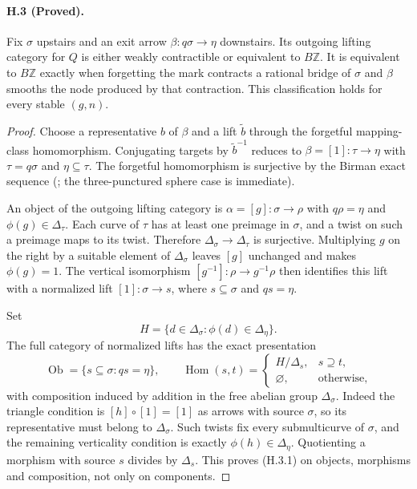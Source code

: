 \paragraph{H.3 (Proved).}
Fix $\sigma$ upstairs and an exit arrow
$\beta:q\sigma\to\eta$ downstairs. Its outgoing lifting
category for $Q$ is either weakly contractible or equivalent to
$B\mathbb Z$. It is equivalent to $B\mathbb Z$ exactly when
forgetting the mark contracts a rational bridge of $\sigma$ and
$\beta$ smooths the node produced by that contraction. This
classification holds for every stable $(g,n)$.
\begin{proof}
Choose a representative $b$ of $\beta$ and a lift $\widetilde b$
through the forgetful mapping-class homomorphism. Conjugating
targets by $\widetilde b^{-1}$ reduces to
$\beta=[1]:\tau\to\eta$ with $\tau=q\sigma$ and
$\eta\subseteq\tau$. The forgetful homomorphism is surjective
by the Birman exact sequence (\citealp[Section 2]{GHIJKentLeiningerSchleimer2009}; the three-punctured sphere case is immediate).

An object of the outgoing lifting category is
$\alpha=[g]:\sigma\to\rho$ with $q\rho=\eta$ and
$\phi(g)\in\Delta_\tau$. Each curve of $\tau$ has at least one
preimage in $\sigma$, and a twist on such a preimage maps to its
twist. Therefore $\Delta_\sigma\to\Delta_\tau$ is surjective.
Multiplying $g$ on the right by a suitable element of
$\Delta_\sigma$ leaves $[g]$ unchanged and makes $\phi(g)=1$.
The vertical isomorphism $[g^{-1}]:\rho\to g^{-1}\rho$ then
identifies this lift with a normalized lift
$[1]:\sigma\to s$, where $s\subseteq\sigma$ and $qs=\eta$.

Set
\[
 H=\{d\in\Delta_\sigma:\phi(d)\in\Delta_\eta\}.
\]
The full category of normalized lifts has the exact presentation
\[
 \operatorname{Ob}=\{s\subseteq\sigma:qs=\eta\},\qquad
 \operatorname{Hom}(s,t)=
 \begin{cases}H/\Delta_s,&s\supseteq t,\\
                \varnothing,&\text{otherwise},\end{cases}
 \tag{H.3.1}
\]
with composition induced by addition in the free abelian group
$\Delta_\sigma$. Indeed the triangle condition is
$[h]\circ[1]=[1]$ as arrows with source $\sigma$, so its
representative must belong to $\Delta_\sigma$. Such twists fix
every submulticurve of $\sigma$, and the remaining verticality
condition is exactly $\phi(h)\in\Delta_\eta$. Quotienting a
morphism with source $s$ divides by $\Delta_s$. This proves
(H.3.1) on objects, morphisms and composition, not only on
components.


\end{proof}
